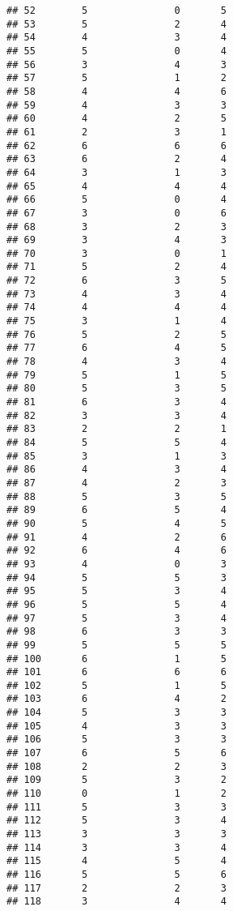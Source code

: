 \documentclass[
]{article}
\begin{document}
\begin{verbatim}
## 52        5               0       5
## 53        5               2       4
## 54        4               3       4
## 55        5               0       4
## 56        3               4       3
## 57        5               1       2
## 58        4               4       6
## 59        4               3       3
## 60        4               2       5
## 61        2               3       1
## 62        6               6       6
## 63        6               2       4
## 64        3               1       3
## 65        4               4       4
## 66        5               0       4
## 67        3               0       6
## 68        3               2       3
## 69        3               4       3
## 70        3               0       1
## 71        5               2       4
## 72        6               3       5
## 73        4               3       4
## 74        4               4       4
## 75        3               1       4
## 76        5               2       5
## 77        6               4       5
## 78        4               3       4
## 79        5               1       5
## 80        5               3       5
## 81        6               3       4
## 82        3               3       4
## 83        2               2       1
## 84        5               5       4
## 85        3               1       3
## 86        4               3       4
## 87        4               2       3
## 88        5               3       5
## 89        6               5       4
## 90        5               4       5
## 91        4               2       6
## 92        6               4       6
## 93        4               0       3
## 94        5               5       3
## 95        5               3       4
## 96        5               5       4
## 97        5               3       4
## 98        6               3       3
## 99        5               5       5
## 100       6               1       5
## 101       6               6       6
## 102       5               1       5
## 103       6               4       2
## 104       5               3       3
## 105       4               3       3
## 106       5               3       3
## 107       6               5       6
## 108       2               2       3
## 109       5               3       2
## 110       0               1       2
## 111       5               3       3
## 112       5               3       4
## 113       3               3       3
## 114       3               3       4
## 115       4               5       4
## 116       5               5       6
## 117       2               2       3
## 118       3               4       4

\end{verbatim}
\end{document}
